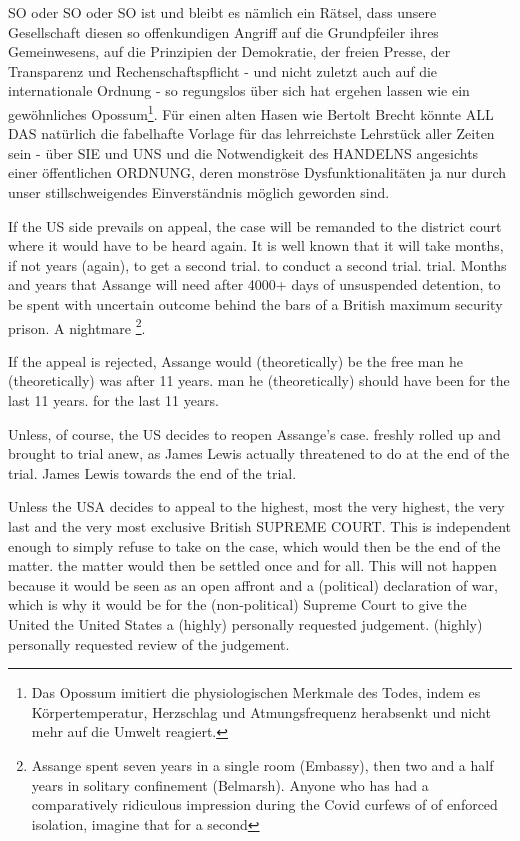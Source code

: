 \begin{multicols}{2}
{SO oder SO oder SO ist und bleibt es nämlich ein Rätsel,
dass unsere Gesellschaft diesen so offenkundigen Angriff
auf die Grundpfeiler ihres Gemeinwesens, auf die Prinzipien der Demokratie, der freien Presse, der Transparenz
und Rechenschaftspflicht - und nicht zuletzt auch auf
die internationale Ordnung - so regungslos über sich hat
ergehen lassen wie ein gewöhnliches 
Opossum\footnote[24]{Das Opossum imitiert die physiologischen Merkmale des Todes, indem es Körpertemperatur, Herzschlag und Atmungsfrequenz herabsenkt und nicht mehr auf die Umwelt reagiert.}.\textCR
Für einen alten Hasen wie Bertolt Brecht könnte ALL
DAS natürlich die fabelhafte Vorlage für das lehrreichste
Lehrstück aller Zeiten sein - über SIE und UNS und die
Notwendigkeit des HANDELNS angesichts einer öffentlichen ORDNUNG, deren monströse Dysfunktionalitäten ja nur durch unser stillschweigendes Einverständnis
möglich geworden sind.}


If the US side prevails on appeal, the case will be remanded to the district court where it would have to be heard again. It is well known that it will take months, if not years (again), to get a second trial.
to conduct a second trial.
trial. Months and years that Assange will need after
4000+ days of unsuspended detention, to be spent with uncertain outcome behind the bars of a British maximum security prison. A nightmare \footnote[23]{Assange spent seven years in a single room (Embassy), then two and a half years in solitary confinement (Belmarsh). Anyone who has had a comparatively ridiculous impression during the Covid curfews of
of enforced isolation, imagine that for a second}.

If the appeal is rejected, Assange would (theoretically) be the free man he (theoretically) was after 11 years.
man he (theoretically) should have been for the last 11 years.
for the last 11 years.

Unless, of course, the US decides to reopen Assange's case.
freshly rolled up and brought to trial anew, as James Lewis actually threatened to do at the end of the trial.
James Lewis towards the end of the trial.

Unless the USA decides to appeal to the highest, most
the very highest, the very last and the very most exclusive British SUPREME COURT. This is
independent enough to simply refuse to take on the case, which would then be the end of the matter.
the matter would then be settled once and for all. This will not happen
because it would be seen as an open affront and a (political) declaration of war, which is why it would be
for the (non-political) Supreme Court to give the United
the United States a (highly) personally requested judgement.
(highly) personally requested review of the judgement.


\end{multicols}
